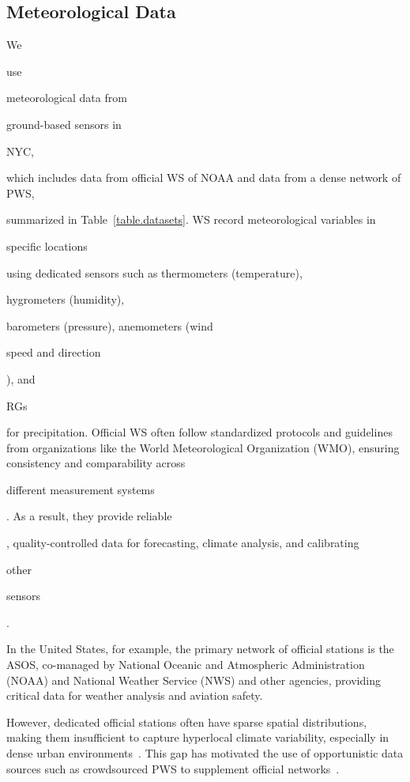 \documentclass[manuscript]{copernicus}
\newif\ifshowrevisions
\newcommand{\blue}[1]{%
  \ifshowrevisions
    \textcolor{black}{#1}%
  \else
    #1%
  \fi
}
\begin{document}
\subsection{Meteorological Data}\label{sec:weather-dataset}
We \blue{use} meteorological data from \blue{ground-based sensors in} NYC, \blue{which includes data from official WS of NOAA and data from a dense network of PWS,} summarized in Table~\ref{table.datasets}.
WS record meteorological variables in \blue{specific locations} using dedicated sensors such as thermometers (temperature), \blue{hygrometers (humidity),} barometers (pressure), anemometers (wind \blue{speed and direction}), and \blue{RGs} for precipitation. 
Official WS often follow standardized protocols and guidelines from organizations like the World Meteorological Organization (WMO), ensuring consistency and comparability across \blue{different measurement systems}.
As a result, they provide reliable\blue{, quality-controlled data for forecasting, climate analysis, and calibrating} other \blue{sensors}. \blue{In the United States, for example, the primary network of official stations is the ASOS, co-managed by National Oceanic and Atmospheric Administration (NOAA) and  National Weather Service (NWS) and other agencies, providing critical data for weather analysis and aviation safety.}
However, dedicated official stations often have sparse spatial distributions, 
making them insufficient to capture hyperlocal climate variability, especially in dense urban environments~\citep{schilling1991rainfall,cristiano2017spatial}. 
This gap has motivated the use of opportunistic data sources such as 
crowdsourced PWS to supplement official networks~\citep{hahn2022observations, 
de2019quality}.
\end{document}
